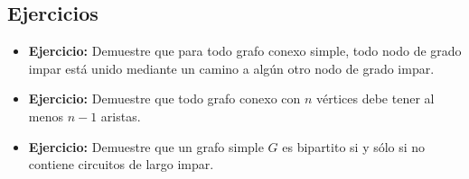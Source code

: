 \subsection{Ejercicios}

\begin{itemize}
  \item \textbf{Ejercicio:} Demuestre que para todo grafo conexo simple, todo nodo de grado impar está unido mediante un camino a algún otro nodo de grado impar.

  \item \textbf{Ejercicio:} Demuestre que todo grafo conexo con $n$ vértices debe tener al menos $n-1$ aristas.

  \item \textbf{Ejercicio:} Demuestre que un grafo simple $G$ es bipartito si y sólo si no contiene circuitos de largo impar.
\end{itemize}
